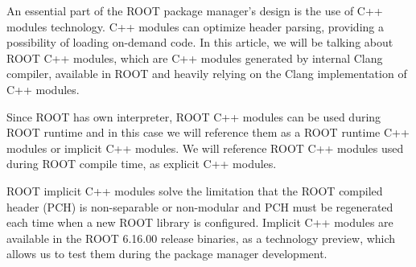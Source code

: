 \documentclass{webofc}
\begin{document}


An essential part of the ROOT package manager's design is the use of C++ modules technology.
C++ modules can optimize header parsing, providing a possibility of loading on-demand code. In this article, we will be talking about ROOT C++ modules, which are C++ modules generated by internal Clang compiler, available in ROOT and heavily relying on the Clang implementation of C++ modules.

Since ROOT has own interpreter, ROOT C++ modules can be used during ROOT runtime and in this case we will reference them as a ROOT runtime C++ modules or implicit C++ modules. We will reference ROOT C++ modules used during ROOT compile time, as explicit C++ modules. 

ROOT implicit C++ modules solve the limitation that the ROOT compiled header (PCH) is non-separable or non-modular and PCH must be regenerated each time when a new ROOT library is configured. Implicit C++ modules are available in the ROOT 6.16.00 release binaries, as a technology preview, which allows us to test them during the package manager development.
\end{document}
